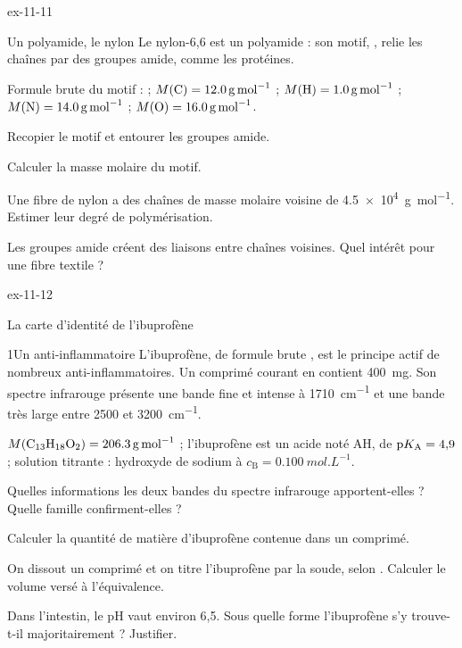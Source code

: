 \begin{blocLivre}{ex-11-11}
\begin{exercice}[2]{Un polyamide, le nylon}
Le nylon-6,6 est un polyamide : son motif, , relie les chaînes par des groupes
amide, comme les protéines.
\begin{donnees}
Formule brute du motif :  ; $M(\ce{C})=\qty{12,0}{g.mol^{-1}}$ ; $M(\ce{H})=\qty{1,0}{g.mol^{-1}}$ ;
$M(\ce{N})=\qty{14,0}{g.mol^{-1}}$ ; $M(\ce{O})=\qty{16,0}{g.mol^{-1}}$.
\end{donnees}
\begin{questions}
\item Recopier le motif et entourer les groupes amide.
\item Calculer la masse molaire du motif.
\item Une fibre de nylon a des chaînes de masse molaire voisine de \qty{4,5e4}{g.mol^{-1}}. Estimer leur degré de
polymérisation.
\item Les groupes amide créent des liaisons entre chaînes voisines. Quel intérêt pour une fibre textile ?
\end{questions}
\end{exercice}
\end{blocLivre}
\begin{blocLivre}{ex-11-12}
\begin{exercice}[3]{La carte d'identité de l'ibuprofène}
\begin{docu}{1}{Un anti-inflammatoire}
L'ibuprofène, de formule brute , est le principe actif de nombreux anti-inflammatoires. Un comprimé
courant en contient 400~mg. Son spectre infrarouge présente une bande fine et intense à \qty{1710}{cm^{-1}} et une
bande très large entre 2500 et \qty{3200}{cm^{-1}}.
\end{docu}
\begin{donnees}
$M(\ce{C13H18O2})=\qty{206,3}{g.mol^{-1}}$ ; l'ibuprofène est un acide noté AH, de $\mathrm{p}K_{\mathrm{A}}=4{,}9$ ; solution titrante :
hydroxyde de sodium à $c_\mathrm{B}=\qty{0,100}{mol.L^{-1}}$.
\end{donnees}
\begin{questions}
\item Quelles informations les deux bandes du spectre infrarouge apportent-elles ? Quelle famille confirment-elles ?
\item Calculer la quantité de matière d'ibuprofène contenue dans un comprimé.
\item On dissout un comprimé et on titre l'ibuprofène par la soude, selon . Calculer le
volume versé à l'équivalence.
\item \initiative Dans l'intestin, le pH vaut environ 6,5. Sous quelle forme l'ibuprofène s'y trouve-t-il
majoritairement ? Justifier.
\end{questions}
\end{exercice}
\end{blocLivre}
